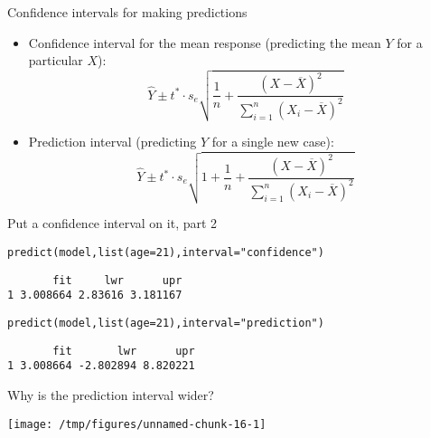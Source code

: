 \documentclass{beamer}\usepackage[]{graphicx}\usepackage[]{color}
\makeatletter
\def\maxwidth{ %
  \ifdim\Gin@nat@width>\linewidth
    \linewidth
  \else
    \Gin@nat@width
  \fi
}
\newcommand{\hlnum}[1]{\textcolor[rgb]{0.824,0.412,0.118}{#1}}%
\newcommand{\hlstr}[1]{\textcolor[rgb]{1,0.894,0.71}{#1}}%
\newcommand{\hlstd}[1]{\textcolor[rgb]{1,0.894,0.769}{#1}}%
\newcommand{\hlkwc}[1]{\textcolor[rgb]{0.78,0.941,0.545}{#1}}%
\newcommand{\hlkwd}[1]{\textcolor[rgb]{1,0.78,0.769}{#1}}%
\newenvironment{kframe}{%
 \def\at@end@of@kframe{}%
 \ifinner\ifhmode%
  \def\at@end@of@kframe{\end{minipage}}%
  \begin{minipage}{\columnwidth}%
 \fi\fi%
 \def\FrameCommand##1{\hskip\@totalleftmargin \hskip-\fboxsep
 \colorbox{shadecolor}{##1}\hskip-\fboxsep
     \hskip-\linewidth \hskip-\@totalleftmargin \hskip\columnwidth}%
 \MakeFramed {\advance\hsize-\width
   \@totalleftmargin\z@ \linewidth\hsize
   \@setminipage}}%
 {\par\unskip\endMakeFramed%
 \at@end@of@kframe}
\newenvironment{knitrout}{}{} %
\makeatother
\begin{document}
\begin{darkframes}
    \begin{frame}{Confidence intervals for making predictions}
      \begin{itemize}
        \item Confidence interval for the mean response (predicting the mean $Y$ for a particular $X$):
        \[
          \hat Y \pm t^* \cdot s_e \sqrt{\frac 1 n + \frac{(X - \overline X)^2}{\sum_{i=1}^n (X_i - \overline X)^2}}
        \]
        \item Prediction interval (predicting $Y$ for a single new case):
        \[
          \hat Y \pm t^* \cdot s_e \sqrt{1 + \frac 1 n + \frac{(X - \overline X)^2}{\sum_{i=1}^n (X_i - \overline X)^2}}
        \]
      \end{itemize}

    \end{frame}

    \begin{frame}[fragile]{Put a confidence interval on it, part 2}

\begin{knitrout}
\color{fgcolor}\begin{kframe}
\begin{alltt}
\hlkwd{predict}\hlstd{(model,} \hlkwd{list}\hlstd{(}\hlkwc{age}\hlstd{=}\hlnum{21}\hlstd{),} \hlkwc{interval}\hlstd{=}\hlstr{"confidence"}\hlstd{)}
\end{alltt}
\begin{verbatim}
       fit     lwr      upr
1 3.008664 2.83616 3.181167
\end{verbatim}
\begin{alltt}
\hlkwd{predict}\hlstd{(model,} \hlkwd{list}\hlstd{(}\hlkwc{age}\hlstd{=}\hlnum{21}\hlstd{),} \hlkwc{interval}\hlstd{=}\hlstr{"prediction"}\hlstd{)}
\end{alltt}
\begin{verbatim}
       fit       lwr      upr
1 3.008664 -2.802894 8.820221
\end{verbatim}
\end{kframe}
\end{knitrout}

      \pause
      Why is the prediction interval wider?
    \end{frame}

    \begin{frame}[fragile]
\begin{knitrout}
\color{fgcolor}
\texttt{[image: /tmp/figures/unnamed-chunk-16-1]} 

\end{knitrout}
    \end{frame}

    
  \end{darkframes}
\end{document}
